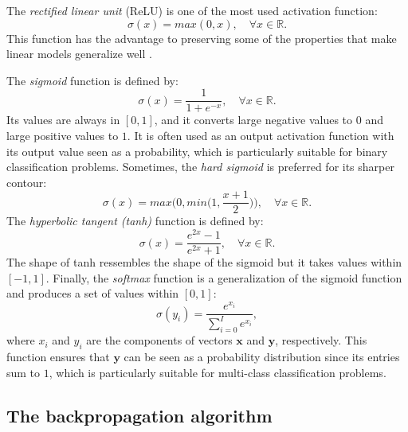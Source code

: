 The \textit{rectified linear unit} (ReLU) is one of the most used activation function:
\begin{equation}
    \sigma(x) = max(0,x), \quad \forall x \in \mathbb{R}.
\end{equation}
This function has the advantage to preserving some of the properties that make linear models generalize well \cite{goodfellow_deep_2016}. 

The \textit{sigmoid} function is defined by:
\begin{equation}
    \sigma(x) = \frac{1}{1+e^{-x}}, \quad \forall x \in \mathbb{R}.
\end{equation}
Its values are always in $[0,1]$, and it converts large negative values to $0$ and large positive values to $1$. It is often used as an output activation function with its output value seen as a probability, which is particularly suitable for binary classification problems. Sometimes, the \textit{hard sigmoid} is preferred for its sharper contour:
\begin{equation}
    \sigma(x) = max\Big(0,min\big(1,\frac{x+1}{2}\big)\Big), \quad \forall x \in \mathbb{R}.
\end{equation}
The \textit{hyperbolic tangent (tanh)} function is defined by:
\begin{equation}
    \sigma(x) = \frac{e^{2x}-1}{e^{2x}+1}, \quad \forall x \in \mathbb{R}.
\end{equation}
The shape of tanh ressembles the shape of the sigmoid but it takes values within $[-1,1]$. Finally, the \textit{softmax} function is a generalization of the sigmoid function and produces a set of values within $[0,1]$:
\begin{equation}
    \sigma(y_i) = \frac{e^{x_i}}{\sum_{i=0}^{I} e^{x_i}},
\end{equation}
where $x_i$ and $y_i$ are the components of vectors $\mathbf{x}$ and $\mathbf{y}$, respectively. This function ensures that $\mathbf{y}$ can be seen as a probability distribution since its entries sum to $1$, which is particularly suitable for multi-class classification problems.


\subsection{The backpropagation algorithm}
\label{sec:backpropagationAlgorithm}

